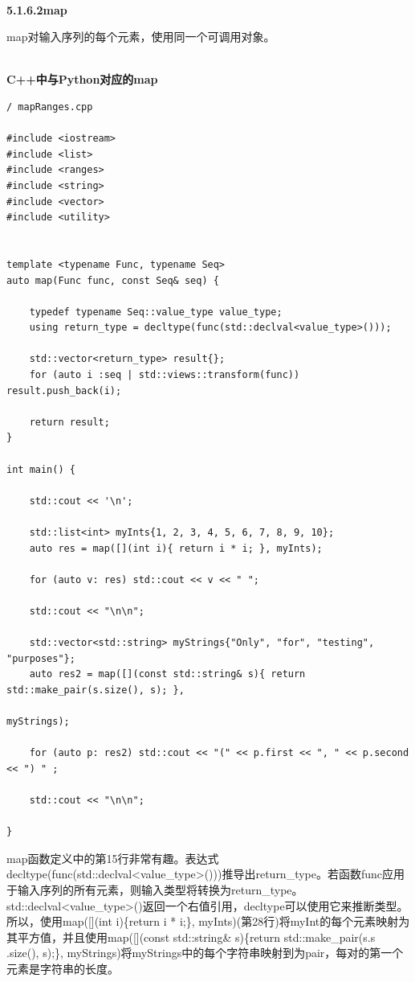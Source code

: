 \hspace*{\fill} \\ %
\noindent
\textbf{5.1.6.2\hspace{0.2cm}map}

map对输入序列的每个元素，使用同一个可调用对象。

\hspace*{\fill} \\ %
\noindent
\textbf{C++中与Python对应的map}
\begin{lstlisting}[style=styleCXX]
/ mapRanges.cpp

#include <iostream>
#include <list>
#include <ranges>
#include <string>
#include <vector>
#include <utility>


template <typename Func, typename Seq>
auto map(Func func, const Seq& seq) {

	typedef typename Seq::value_type value_type;
	using return_type = decltype(func(std::declval<value_type>()));
	
	std::vector<return_type> result{};
	for (auto i :seq | std::views::transform(func)) result.push_back(i);
	
	return result;
}

int main() {

	std::cout << '\n';
	
	std::list<int> myInts{1, 2, 3, 4, 5, 6, 7, 8, 9, 10};
	auto res = map([](int i){ return i * i; }, myInts);
	
	for (auto v: res) std::cout << v << " ";
	
	std::cout << "\n\n";
	
	std::vector<std::string> myStrings{"Only", "for", "testing", "purposes"};
	auto res2 = map([](const std::string& s){ return std::make_pair(s.size(), s); },
	                                                                myStrings);
	
	for (auto p: res2) std::cout << "(" << p.first << ", " << p.second << ") " ;
	
	std::cout << "\n\n";

}
\end{lstlisting}

map函数定义中的第15行非常有趣。表达式decltype(func(std::declval<value\_type>()))推导出return\_type。若函数func应用于输入序列的所有元素，则输入类型将转换为return\_type。std::declval<value\_type>()返回一个右值引用，decltype可以使用它来推断类型。所以，使用map([](int i)\{return i * i;\}, myInts)(第28行)将myInt的每个元素映射为其平方值，并且使用map([](const std::string\& s)\{return std::make\_pair(s.s .size(), s);\}, myStrings)将myStrings中的每个字符串映射到为pair，每对的第一个元素是字符串的长度。

